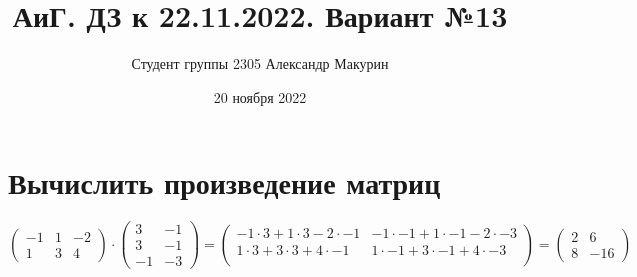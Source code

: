 \documentclass[12pt]{article}
\title{АиГ. ДЗ к 22.11.2022. Вариант №13}
\author{Студент группы 2305 Александр Макурин}
\date{20 ноября 2022}
\begin{document}
\maketitle

\begin{sloppypar}

    \section{Вычислить произведение матриц}
    \[
        \begin{pmatrix}
            -1 & 1 & -2 \\
            1  & 3 & 4
        \end{pmatrix}
        \cdot
        \begin{pmatrix}
            3  & -1 \\
            3  & -1 \\
            -1 & -3
        \end{pmatrix}
        =
        \begin{pmatrix}
            -1 \cdot 3 + 1 \cdot 3 - 2 \cdot -1 & -1 \cdot -1 + 1 \cdot -1 - 2 \cdot -3 \\
            1 \cdot 3 + 3 \cdot 3 + 4 \cdot -1  & 1 \cdot -1 + 3 \cdot -1 + 4 \cdot -3  \\
        \end{pmatrix}
        =
        \begin{pmatrix}
            2 & 6   \\
            8 & -16
        \end{pmatrix}
    \]



\end{sloppypar}
\end{document}
